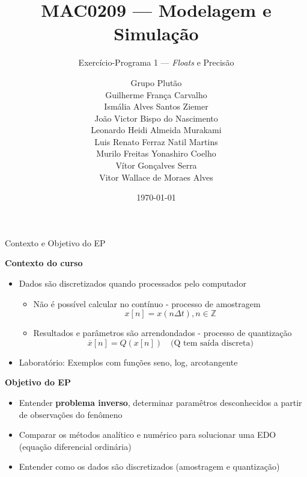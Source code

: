 \documentclass[aspectratio=169]{beamer}
\title{MAC0209 --- Modelagem e Simulação}
\subtitle{Exercício-Programa 1 --- \textit{Floats} e Precisão}
\author[Grupo Plutão]{Grupo Plutão \\[4pt]
Guilherme França Carvalho \\
Ismália Alves Santos Ziemer \\
João Victor Bispo do Nascimento \\
Leonardo Heidi Almeida Murakami \\
Luis Renato Ferraz Natil Martins \\
Murilo Freitas Yonashiro Coelho \\
Vítor Gonçalves Serra \\
Vitor Wallace de Moraes Alves }
\institute[BCC IME-USP]{Bacharelado em Ciência da Computação \\ IME -- USP}
\date{\today}
\begin{document}
\begin{frame}
\titlepage
\end{frame}

\begin{frame}{Contexto e Objetivo do EP}

\textbf{Contexto do curso}

\begin{itemize}
    \item Dados são discretizados quando processados pelo computador
    \begin{itemize}
        \item Não é possível calcular no contínuo - processo de amostragem
            \begin{equation}
                x[n] = x(n\Delta t), n \in \mathbb{Z}
            \end{equation}
        \item Resultados e parâmetros são arrendondados - processo de quantização
            \begin{equation}
                \overline x[n] = Q(x[n]) \quad \text{(Q tem saída discreta)}
            \end{equation}
    \end{itemize}
    \item Laboratório: Exemplos com funções seno, log, arcotangente
\end{itemize}

\vspace{0.5cm}

\textbf{Objetivo do EP}

\begin{itemize}
    \item Entender \textbf{problema inverso}, determinar paramêtros
        desconhecidos a partir de observações do fenômeno
    \item Comparar os métodos analítico e numérico para solucionar uma EDO (equação diferencial ordinária)
    \item Entender como os dados são discretizados (amostragem e quantização)
\end{itemize}

\end{frame}
\end{document}
